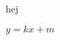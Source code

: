 \documentclass[a4paper, 10pt]{article}
\author{NAME}
\begin{document}
hej
\begin{itemize}
    $y = kx+m$
\end{itemize}
\end{document}
